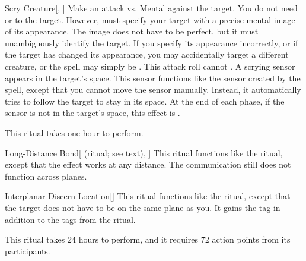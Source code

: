\lowercase{\hypertarget{spell:Scry Creature}{}}\label{spell:Scry Creature}
\begin{apability}[Rank 5]{\hypertarget{spell:Scry Creature}{Scry Creature}}[, ]
Make an attack vs. Mental against the target.
You do not need  or  to the target.
However,  must specify your target with a precise mental image of its appearance.
The image does not have to be perfect, but it must unambiguously identify the target.
If you specify its appearance incorrectly, or if the target has changed its appearance, you may accidentally target a different creature, or the spell may simply be .
This attack roll cannot .
\hit A scrying sensor appears in the target's space.
This sensor functions like the sensor created by the  spell, except that you cannot move the sensor manually.
Instead, it automatically tries to follow the target to stay in its space.
At the end of each phase, if the sensor is not in the target's space, this effect is .

This ritual takes one hour to perform.
\end{apability}
\vspace{0.25em}



\lowercase{\hypertarget{spell:Long-Distance Bond}{}}\label{spell:Long-Distance Bond}
\begin{attuneability}[Rank 6]{\hypertarget{spell:Long-Distance Bond}{Long-Distance Bond}}[ (ritual; see text), ]
This ritual functions like the  ritual, except that the effect works at any distance.
The communication still does not function across planes.
\end{attuneability}
\vspace{0.25em}



\lowercase{\hypertarget{spell:Interplanar Discern Location}{}}\label{spell:Interplanar Discern Location}
\begin{apability}[Rank 7]{\hypertarget{spell:Interplanar Discern Location}{Interplanar Discern Location}}[]
This ritual functions like the  ritual, except that the target does not have to be on the same plane as you.
It gains the  tag in addition to the tags from the  ritual.

This ritual takes 24 hours to perform, and it requires 72 action points from its participants.
\end{apability}
\vspace{0.25em}




